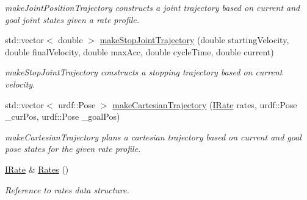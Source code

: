 \begin{DoxyCompactItemize}
\begin{DoxyCompactList}\small\item\em make\-Joint\-Position\-Trajectory constructs a joint trajectory based on current and goal joint states given a rate profile. \end{DoxyCompactList}\item 
std\-::vector$<$ double $>$ \hyperlink{classTrajectoryMaker_a4fab7f6ee775ec1cdd8685a2b068cd27}{make\-Stop\-Joint\-Trajectory} (double starting\-Velocity, double final\-Velocity, double max\-Acc, double cycle\-Time, double current)
\begin{DoxyCompactList}\small\item\em make\-Stop\-Joint\-Trajectory constructs a stopping trajectory based on current velocity. \end{DoxyCompactList}\item 
std\-::vector$<$ urdf\-::\-Pose $>$ \hyperlink{classTrajectoryMaker_a70ee83146af8b44642b18111843071a9}{make\-Cartesian\-Trajectory} (\hyperlink{classIRate}{I\-Rate} rates, urdf\-::\-Pose \-\_\-cur\-Pos, urdf\-::\-Pose \-\_\-goal\-Pos)
\begin{DoxyCompactList}\small\item\em make\-Cartesian\-Trajectory plans a cartesian trajectory based on current and goal pose states for the given rate profile. \end{DoxyCompactList}\item 
\hyperlink{classIRate}{I\-Rate} \& \hyperlink{classTrajectoryMaker_a6fc72a7ec77f674fcee7afea3441fa02}{Rates} ()
\begin{DoxyCompactList}\small\item\em Reference to rates data structure. \end{DoxyCompactList}\end{DoxyCompactItemize}
